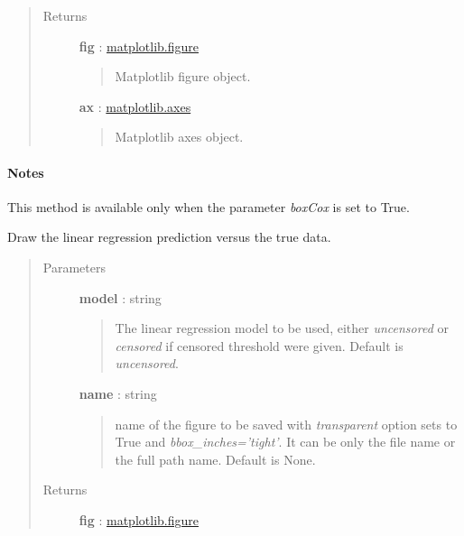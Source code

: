 \documentclass[letterpaper,10pt,english]{sphinxmanual}
\begin{document}
\begin{fulllineitems}
\begin{fulllineitems}
\begin{quote}
\begin{description}
\item[{Returns}] \leavevmode
\textbf{fig} : \href{http://matplotlib.org/api/figure\_api.html}{matplotlib.figure}
\begin{quote}

Matplotlib figure object.
\end{quote}

\textbf{ax} : \href{http://matplotlib.org/api/axes\_api.html}{matplotlib.axes}
\begin{quote}

Matplotlib axes object.
\end{quote}

\end{description}\end{quote}
\paragraph{Notes}

This method is available only when the parameter \emph{boxCox} is set to True.

\end{fulllineitems}


\begin{fulllineitems}
\label{_generated/otpod.UnivariateLinearModelAnalysis:otpod.UnivariateLinearModelAnalysis.drawLinearModel}
Draw the linear regression prediction versus the true data.
\begin{quote}\begin{description}
\item[{Parameters}] \leavevmode
\textbf{model} : string
\begin{quote}

The linear regression model to be used, either \emph{uncensored} or
\emph{censored} if censored threshold were given. Default is \emph{uncensored}.
\end{quote}

\textbf{name} : string
\begin{quote}

name of the figure to be saved with \emph{transparent} option sets to True
and \emph{bbox\_inches='tight'}. It can be only the file name or the 
full path name. Default is None.
\end{quote}

\item[{Returns}] \leavevmode
\textbf{fig} : \href{http://matplotlib.org/api/figure\_api.html}{matplotlib.figure}
\begin{quote}


\end{quote}
\end{description}
\end{quote}
\end{fulllineitems}
\end{fulllineitems}
\end{document}
